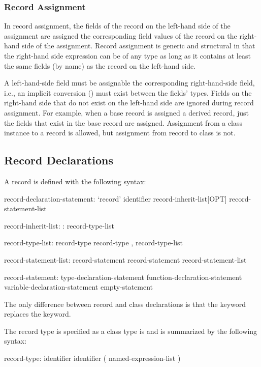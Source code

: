 \subsubsection{Record Assignment}
\label{Record_Assignment}

In record assignment, the fields of the record on the left-hand side
of the assignment are assigned the corresponding field values of the record
on the right-hand side of the assignment.
Record assignment is generic and structural in that the
right-hand side expression can be of any type as long as it
contains at least the same fields (by name) as the record on the left-hand
side.

A left-hand-side field must be assignable the corresponding
right-hand-side field, i.e., an implicit conversion
() must exist between the fields' types.
Fields on the right-hand side that do not exist on the left-hand side
are ignored during record assignment.  For example, when a base record is
assigned a derived record, just the fields that exist in the base
record are assigned.
Assignment from a class instance to a record is allowed, but assignment
from record to class is not.

\subsection{Record Declarations}
\label{Record_Declarations}

A record is defined with the following syntax:
\begin{syntax}
record-declaration-statement:
  `record' identifier record-inherit-list[OPT] {
    record-statement-list }

record-inherit-list:
  : record-type-list

record-type-list:
  record-type
  record-type , record-type-list

record-statement-list:
  record-statement
  record-statement record-statement-list

record-statement:
  type-declaration-statement
  function-declaration-statement
  variable-declaration-statement
  empty-statement
\end{syntax}
The only difference between record and class declarations is that
the  keyword replaces the  keyword.

The record type is specified as a class type is and is summarized by
the following syntax:
\begin{syntax}
record-type:
  identifier
  identifier ( named-expression-list )
\end{syntax}

